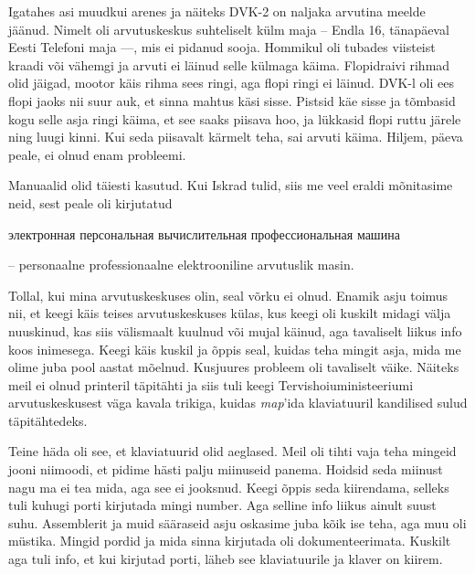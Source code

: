 Igatahes asi muudkui arenes ja näiteks DVK-2 on naljaka arvutina 
meelde jäänud. Nimelt oli arvutuskeskus suhteliselt külm maja -- Endla 16, 
tänapäeval Eesti Telefoni maja ---, mis ei pidanud sooja. Hommikul oli tubades viisteist kraadi või 
vähemgi ja arvuti ei läinud selle külmaga käima. Flopidraivi rihmad olid 
jäigad, mootor käis rihma sees ringi, aga flopi ringi ei läinud. 
DVK-l oli ees flopi jaoks nii suur auk, et sinna mahtus käsi sisse. 
Pistsid käe sisse ja tõmbasid kogu selle asja ringi käima, et see saaks piisava hoo, 
ja lükkasid flopi ruttu järele ning luugi kinni. Kui seda piisavalt kärmelt 
teha, sai arvuti käima. Hiljem, päeva peale, ei olnud enam probleemi. 


Manuaalid olid täiesti kasutud. Kui Iskrad 
tulid, siis me veel eraldi mõnitasime neid, sest peale oli kirjutatud 
\begin{russian}электронная персональная вычислительная профессиональная 
машина\end{russian} -- personaalne professionaalne elektrooniline arvutuslik 
masin. 


Tollal, kui mina arvutuskeskuses olin, seal võrku ei 
olnud. Enamik asju toimus nii, et keegi käis teises 
arvutuskeskuses külas, kus keegi oli kuskilt midagi välja nuuskinud, kas siis välismaalt kuulnud või mujal käinud, aga tavaliselt liikus info koos 
inimesega. Keegi käis kuskil ja õppis seal, kuidas teha 
mingit asja, mida me olime juba pool aastat mõelnud. Kusjuures probleem oli 
tavaliselt väike. Näiteks meil ei olnud printeril täpitähti ja siis tuli keegi Tervishoiuministeeriumi arvutuskeskusest 
väga kavala trikiga, kuidas \emph{map}'ida klaviatuuril kandilised sulud 
täpitähtedeks.

Teine häda oli see, et klaviatuurid olid aeglased. Meil oli tihti vaja teha
mingeid jooni niimoodi, et pidime hästi palju miinuseid panema. Hoidsid seda miinust 
nagu ma ei tea mida, aga see ei jooksnud. Keegi õppis seda 
kiirendama, selleks tuli kuhugi porti kirjutada mingi number. Aga selline info 
liikus ainult suust suhu. Assemblerit ja muid sääraseid asju oskasime juba 
kõik ise teha, aga muu oli müstika. Mingid pordid ja mida sinna 
kirjutada oli dokumenteerimata. Kuskilt aga tuli info, et kui kirjutad porti, läheb see klaviatuurile ja klaver on kiirem. 


